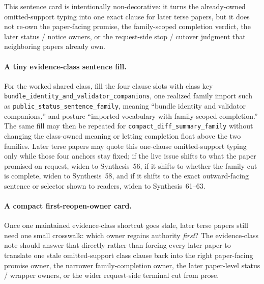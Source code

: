 \documentclass[11pt]{article}
\begin{document}
This sentence card is intentionally non-decorative: it turns the already-owned omitted-support typing into one exact clause for later terse papers, but it does not re-own the paper-facing promise, the family-scoped completion verdict, the later status / notice owners, or the request-side stop / cutover judgment that neighboring papers already own.\cite{series:workedexample}

\paragraph{A tiny evidence-class sentence fill.}
For the worked shared class, fill the four clause slots with class key \nolinkurl{bundle_identity_and_validator_companions}, one realized family import such as \nolinkurl{public_status_sentence_family}, meaning ``bundle identity and validator companions,'' and posture ``imported vocabulary with family-scoped completion.'' The same fill may then be repeated for \nolinkurl{compact_diff_summary_family} without changing the class-owned meaning or letting completion float above the two families. Later terse papers may quote this one-clause omitted-support typing only while those four anchors stay fixed; if the live issue shifts to what the paper promised on request, widen to Synthesis~56, if it shifts to whether the family cut is complete, widen to Synthesis~58, and if it shifts to the exact outward-facing sentence or selector shown to readers, widen to Synthesis~61--63.\cite{series:workedexample}

\paragraph{A compact first-reopen-owner card.}
Once one maintained evidence-class shortcut goes stale, later terse papers still need one small crosswalk: which owner regains authority \emph{first}? The evidence-class note should answer that directly rather than forcing every later paper to translate one stale omitted-support class clause back into the right paper-facing promise owner, the narrower family-completion owner, the later paper-level status / wrapper owners, or the wider request-side terminal cut from prose.
\end{document}
